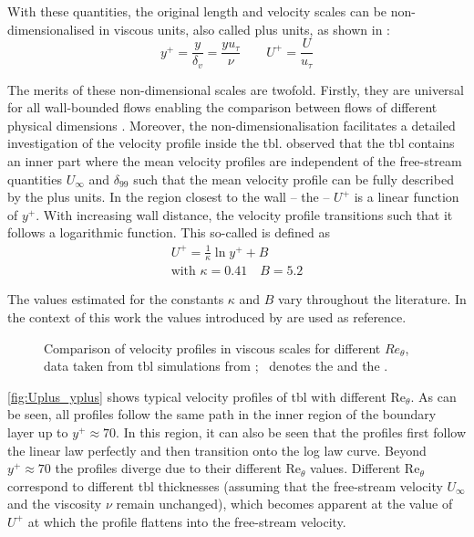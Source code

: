 With these quantities, the original length and velocity scales can be non-dimensionalised in viscous units, also called plus units, as shown in \citep{moin_fundamentals_2024}:
\begin{equation}
    y^+ = \frac{y}{\delta_v} = \frac{y u_\tau}{\nu} \qquad
    U^+ = \frac{U}{u_\tau}
\end{equation}

The merits of these non-dimensional scales are twofold.  
Firstly, they are universal for all wall-bounded flows enabling the comparison between flows of different physical dimensions \citep{von_karman_mechanische_1930}.
Moreover, the non-dimensionalisation facilitates a detailed investigation of the velocity profile inside the \acrshort{tbl}.
\citet{prandtl_uber_1904} observed that the \acrshort{tbl} contains an inner part where the mean velocity profiles are independent of the free-stream quantities $U_{\infty}$ and $\delta_{99}$ such that the mean velocity profile can be fully described by the plus units.
In the region closest to the wall – the  – $U^+$ is a linear function of $y^+$. 
With increasing wall distance, the velocity profile transitions such that it follows a logarithmic function.
This so-called  is defined as 
\begin{gather}
    U^+ = \frac{1}{\kappa}\ln y^+ + B \\
    \text{with } \kappa = 0.41 \quad B = 5.2
\end{gather}

The values estimated for the constants $\kappa$ and $B$ vary throughout the literature.
In the context of this work the values introduced by \citet{pope_turbulent_2015} are used as reference.

\begin{figure}[H]
    \centering
    
    \caption{Comparison of velocity profiles in viscous scales for different $Re_\theta$, data taken from \acrshort{tbl} simulations from \citet{balasubramanian_direct_2023}; ~denotes the  and the .}
    \label{fig:Uplus_yplus}
\end{figure}

\autoref{fig:Uplus_yplus} shows typical velocity profiles of \acrfull{tbl} with different $\mathrm{Re}_{\theta}$.
As can be seen, all profiles follow the same path in the inner region of the boundary layer up to $y^+ \approx 70$.
In this region, it can also be seen that the profiles first follow the linear law perfectly and then transition onto the log law curve.
Beyond $y^+ \approx 70$ the profiles diverge due to their different $\mathrm{Re}_{\theta}$ values.
Different $\mathrm{Re}_{\theta}$ correspond to different \acrshort{tbl} thicknesses (assuming that the free-stream velocity $U_{\infty}$ and the viscosity $\nu$ remain unchanged), which becomes apparent at the value of $U^+$ at which the profile flattens into the free-stream velocity.


